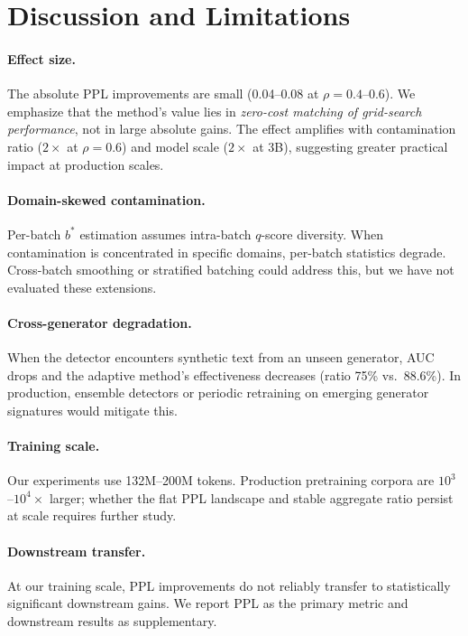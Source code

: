 \documentclass[11pt,a4paper]{article}
\newcommand{\bstar}{b^{*}}
\begin{document}
\section{Discussion and Limitations}
\label{sec:limitations}

\paragraph{Effect size.}
The absolute PPL improvements are small (0.04--0.08 at $\rho{=}0.4$--$0.6$).
We emphasize that the method's value lies in \emph{zero-cost matching of grid-search performance}, not in large absolute gains.
The effect amplifies with contamination ratio ($2\times$ at $\rho{=}0.6$) and model scale ($2\times$ at 3B), suggesting greater practical impact at production scales.

\paragraph{Domain-skewed contamination.}
Per-batch $\bstar$ estimation assumes intra-batch $q$-score diversity.
When contamination is concentrated in specific domains, per-batch statistics degrade.
Cross-batch smoothing or stratified batching could address this, but we have not evaluated these extensions.

\paragraph{Cross-generator degradation.}
When the detector encounters synthetic text from an unseen generator, AUC drops and the adaptive method's effectiveness decreases (ratio 75\% vs.\ 88.6\%).
In production, ensemble detectors or periodic retraining on emerging generator signatures would mitigate this.

\paragraph{Training scale.}
Our experiments use 132M--200M tokens.
Production pretraining corpora are $10^3$--$10^4\times$ larger; whether the flat PPL landscape and stable aggregate ratio persist at scale requires further study.

\paragraph{Downstream transfer.}
At our training scale, PPL improvements do not reliably transfer to statistically significant downstream gains.
We report PPL as the primary metric and downstream results as supplementary.
\end{document}
